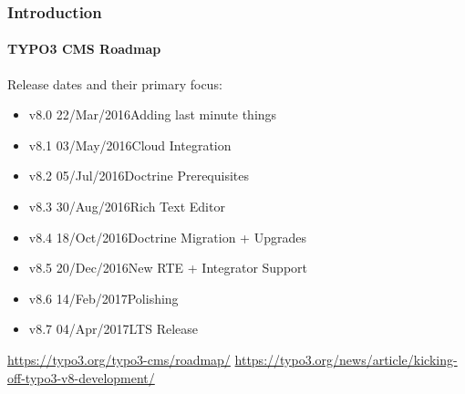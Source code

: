\begin{frame}[fragile]
	\frametitle{Introduction}
	\framesubtitle{TYPO3 CMS Roadmap}

	Release dates and their primary focus:

	\begin{itemize}

		\item v8.0 \tabto{1.1cm}22/Mar/2016\tabto{3.4cm}Adding last minute things
		\item v8.1 \tabto{1.1cm}03/May/2016\tabto{3.4cm}Cloud Integration
		\item v8.2 \tabto{1.1cm}05/Jul/2016\tabto{3.4cm}Doctrine Prerequisites
		\item v8.3 \tabto{1.1cm}30/Aug/2016\tabto{3.4cm}Rich Text Editor
		\item v8.4 \tabto{1.1cm}18/Oct/2016\tabto{3.4cm}Doctrine Migration + Upgrades
		\item v8.5 \tabto{1.1cm}20/Dec/2016\tabto{3.4cm}New RTE + Integrator Support
		\item v8.6 \tabto{1.1cm}14/Feb/2017\tabto{3.4cm}Polishing
		\item
			\begingroup
				\color{typo3orange}
					v8.7 \tabto{1.1cm}04/Apr/2017\tabto{3.4cm}LTS Release
			\endgroup

	\end{itemize}

	\smaller
		\url{https://typo3.org/typo3-cms/roadmap/}\newline
		\url{https://typo3.org/news/article/kicking-off-typo3-v8-development/}
	\normalsize

\end{frame}

